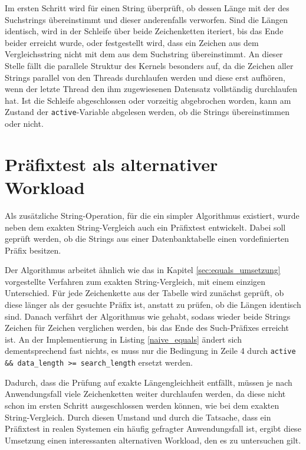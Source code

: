 Im ersten Schritt wird für einen String überprüft, ob dessen Länge mit der des Suchstrings übereinstimmt und dieser anderenfalls verworfen.
Sind die Längen identisch, wird in der Schleife über beide Zeichenketten iteriert, bis das Ende beider erreicht wurde, oder festgestellt wird, dass ein Zeichen aus dem Vergleichsstring nicht mit dem aus dem Suchstring übereinstimmt.
An dieser Stelle fällt die parallele Struktur des Kernels besonders auf, da die Zeichen aller Strings parallel von den Threads durchlaufen werden und diese erst aufhören, wenn der letzte Thread den ihm zugewiesenen Datensatz vollständig durchlaufen hat.
Ist die Schleife abgeschlossen oder vorzeitig abgebrochen worden, kann am Zustand der \texttt{active}-Variable abgelesen werden, ob die Strings übereinstimmen oder nicht.

\section{Präfixtest als alternativer Workload}
\label{sec:prefixtest}

Als zusätzliche String-Operation, für die ein simpler Algorithmus existiert, wurde neben dem exakten String-Vergleich auch ein Präfixtest entwickelt.
Dabei soll geprüft werden, ob die Strings aus einer Datenbanktabelle einen vordefinierten Präfix besitzen.

Der Algorithmus arbeitet ähnlich wie das in Kapitel \ref{sec:equals_umsetzung} vorgestellte Verfahren zum exakten String-Vergleich, mit einem einzigen Unterschied.
Für jede Zeichenkette aus der Tabelle wird zunächst geprüft, ob diese länger als der gesuchte Präfix ist, anstatt zu prüfen, ob die Längen identisch sind.
Danach verfährt der Algorithmus wie gehabt, sodass wieder beide Strings Zeichen für Zeichen verglichen werden, bis das Ende des Such-Präfixes erreicht ist.
An der Implementierung in Listing \ref{naive_equals} ändert sich dementsprechend fast nichts, es muss nur die Bedingung in Zeile 4 durch \texttt{active \&\& data\_length >= search\_length} ersetzt werden.

Dadurch, dass die Prüfung auf exakte Längengleichheit entfällt, müssen je nach Anwendungsfall viele Zeichenketten weiter durchlaufen werden, da diese nicht schon im ersten Schritt ausgeschlossen werden können, wie bei dem exakten String-Vergleich.
Durch diesen Umstand und durch die Tatsache, dass ein Präfixtest in realen Systemen ein häufig gefragter Anwendungsfall ist, ergibt diese Umsetzung einen interessanten alternativen Workload, den es zu untersuchen gilt.

